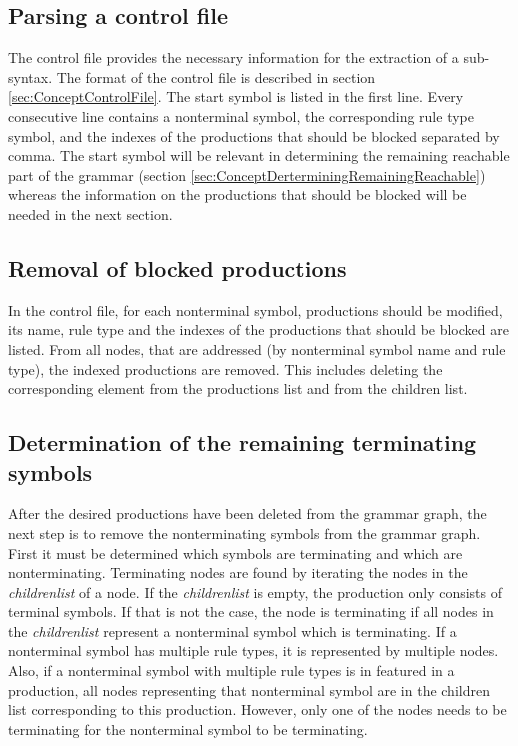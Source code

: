 \subsection{Parsing a control file}\label{sec:ConceptParsingControlFile}

The control file provides the necessary information for the extraction of a sub-syntax.
The format of the control file is described in section \ref{sec:ConceptControlFile}. 
The start symbol is listed in the first line.
Every consecutive line contains a nonterminal symbol, the corresponding rule type symbol, and the indexes of the productions that should be blocked separated by comma.
The start symbol will be relevant in determining the remaining reachable part of the grammar (section \ref{sec:ConceptDerterminingRemainingReachable}) whereas the information on the productions that should be blocked will be needed in the next section.

\subsection{Removal of blocked productions}\label{sec:ConceptRemovingBlockedProductions}

In the control file, for each nonterminal symbol, productions should be modified, its name, rule type and the indexes of the productions that should be blocked are listed.
From all nodes, that are addressed (by nonterminal symbol name and rule type), the indexed productions are removed.
This includes deleting the corresponding element from the productions list and from the children list.

\subsection{Determination of the remaining terminating symbols}\label{sec:ConceptDerterminingRemainingTerminating}

After the desired productions have been deleted from the grammar graph, the next step is to remove the nonterminating symbols from the grammar graph.
First it must be determined which symbols are terminating and which are nonterminating.
Terminating nodes are found by iterating the nodes in the \textit{children\textunderscore list} of a node.
If the \textit{children\textunderscore list} is empty, the production only consists of terminal symbols.
If that is not the case, the node is terminating if all nodes in the \textit{children\textunderscore list} represent a nonterminal symbol which is terminating.
If a nonterminal symbol has multiple rule types, it is represented by multiple nodes. Also, if a nonterminal symbol with multiple rule types is in featured in a production, all nodes representing that nonterminal symbol are in the children list corresponding to this production. However, only one of the nodes needs to be terminating for the nonterminal symbol to be terminating.

